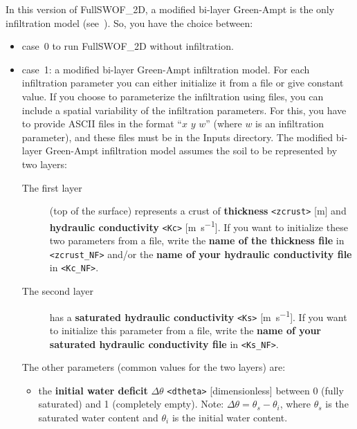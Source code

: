 \documentclass[a4paper, 11pt]{article}
\newcommand{\FullSWOF}{FullSWOF\_2D}
\begin{document}
In this version of \FullSWOF, a modified bi-layer Green-Ampt is the only infiltration model (see~\citet{Esteves00}).
So, you have the choice between:
\begin{itemize}
	\item case~0 to run \FullSWOF{} without infiltration.
	\item case~1: a modified bi-layer Green-Ampt infiltration model.\newline
	      For each infiltration parameter you can either initialize it from a file or give constant value.\newline
	      If you choose to parameterize the infiltration using files, you can include a spatial variability of the infiltration parameters.
	      For this, you have to provide ASCII files in the format ``\(x\) \(y\) \(w\)'' (where \(w\) is an infiltration parameter), and these files must be in the \textsf{Inputs} directory.
	      \newline
	      The modified bi-layer Green-Ampt infiltration model assumes the soil to be represented by two layers:
	      \begin{description}
		      \item[The first layer] (top of the surface) represents a crust of \textbf{thickness} \texttt{<zcrust>} [\si{\meter}] and \textbf{hydraulic conductivity} \texttt{<Kc>} [\si{\meter\per\second}].\newline
		            If you want to initialize these two parameters from a file, write the \textbf{name of the thickness file} in \texttt{<zcrust\_NF>} and/or the \textbf{name of your hydraulic conductivity file} in \texttt{<Kc\_NF>}.
		      \item[The second layer] has a \textbf{saturated hydraulic conductivity} \texttt{<Ks>} [\si{\meter\per\second}].\newline
		            If you want to initialize this parameter from a file, write the \textbf{name of your saturated hydraulic conductivity file} in \texttt{<Ks\_NF>}.
	      \end{description}
	      The other parameters (common values for the two layers) are:
	      \begin{itemize}
		      \item the \textbf{initial water deficit} \textbf{\(\Delta\theta\)} \texttt{<dtheta>} [\si{dimensionless}] between 0 (fully saturated) and 1 (completely empty).
		            Note: \(\Delta\theta=\theta_s-\theta_{i}\), where \(\theta_s\) is the saturated water content and \(\theta_i\) is the initial water content.

\end{itemize}
\end{itemize}
\end{document}
